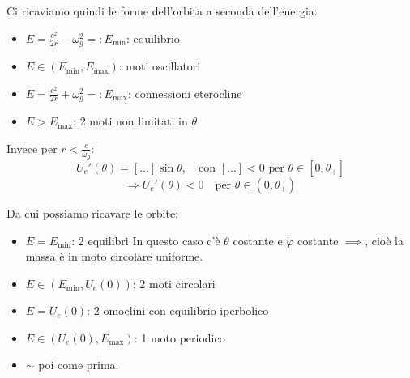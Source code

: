\begin{example}
    Ci ricaviamo quindi le forme dell'orbita a seconda dell'energia:
    \begin{itemize}
        \item $E = \frac{c^2}{2r} - \omega_g^2 =: E_{\min}$: equilibrio
        \item $E \in (E_{\min}, E_{\max})$: moti oscillatori
        \item $E = \frac{c^2}{2r} + \omega_g^2 =: E_{\max}$: connessioni eterocline
        \item $E > E_{\max}$: 2 moti non limitati in $\theta$
    \end{itemize}

    Invece per $r<\frac{c}{\omega_g}$:
    \begin{equation}
        U_e'(\theta) = \left[ \dots \right] \sin\theta, \quad \text{con } \left[ \dots \right] < 0 \text{ per } \theta \in [0, \theta_+]
    \end{equation}
    \begin{equation}
        \Rightarrow U_e'(\theta) < 0 \quad \text{per } \theta \in (0, \theta_+)
    \end{equation}

    Da cui possiamo ricavare le orbite:
    \begin{itemize}
        \item $E = E_{\min}$: 2 equilibri
        In questo caso c'è $\theta$ costante e $\dot{\varphi}$ costante $\implies$, cioè la massa è in moto circolare uniforme.
        
        \item $E \in (E_{\min}, U_e(0))$: 2 moti circolari

        \item $E = U_e(0)$: 2 omoclini con equilibrio iperbolico

        \item $E \in (U_e(0), E_{\max})$: 1 moto periodico
        
        \item $\sim$ poi come prima.
    \end{itemize}

\end{example}

